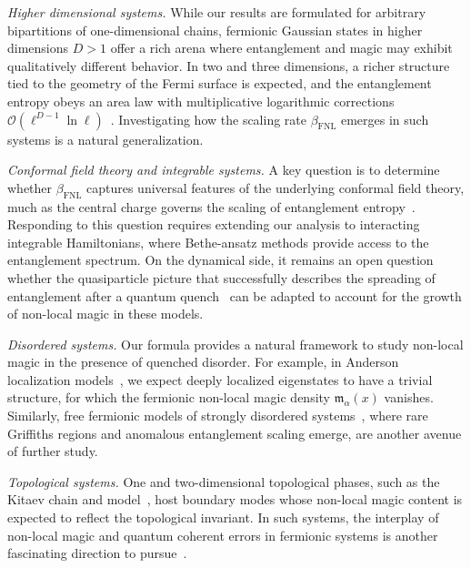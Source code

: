 \documentclass[prx,twocolumn,superscriptaddress,aps,10pt, frontmatterverbose, reprint,footinbib,longbibliography=true]{revtex4-2}
\newcommand{\RENYI}{\alpha}
\begin{document}
\emph{Higher dimensional systems.}
While our results are formulated for arbitrary bipartitions of one-dimensional chains, fermionic Gaussian states in higher dimensions $D>1$ offer a rich arena where entanglement and magic may exhibit qualitatively different behavior. In two and three dimensions, a richer structure tied to the geometry of the Fermi surface is expected, and the entanglement entropy obeys an area law with multiplicative logarithmic corrections $\mathcal{O}(\ell^{D-1}\ln\ell)$~\cite{swingle2010entanglement}. 
Investigating how the scaling rate $\beta_\mathrm{FNL}$ emerges in such systems is a natural generalization.


\emph{Conformal field theory and integrable systems.}
A key question is to determine whether $\beta_{\mathrm{FNL}}$ captures universal features of the underlying conformal field theory, much as the central charge governs the scaling of entanglement entropy~\cite{Calabrese2004entanglement}.
Responding to this question requires extending our analysis to interacting integrable Hamiltonians, where Bethe-ansatz methods provide access to the entanglement spectrum.
On the dynamical side, it remains an open question whether the quasiparticle picture that successfully describes the spreading of entanglement after a quantum quench~\cite{Alba_2017,alba2019,Kudler_Flam_2021} can be adapted to account for the growth of non-local magic in these models.

\emph{Disordered systems.}
Our formula provides a natural framework to study non-local magic in the presence of quenched disorder. 
For example, in Anderson localization models~\cite{evers,sierant2020}, we expect deeply localized eigenstates to have a trivial structure, for which the fermionic non-local magic density $\mathfrak{m}_\RENYI(x)$ vanishes. 
Similarly, free fermionic models of strongly disordered systems~\cite{IGLOI_2005,Monthus_2018,ruggiero2022}, where rare Griffiths regions and anomalous entanglement scaling emerge, are another avenue of further study.

\emph{Topological systems.}
One and two-dimensional topological phases, such as the Kitaev chain and model~\cite{Kitaev2001chain,Kitaev_2006}, host boundary modes whose non-local magic content is expected to reflect the topological invariant.
In such systems, the interplay of non-local magic and quantum coherent errors in fermionic systems is another fascinating direction to pursue~\cite{beri,gskb-t5ql}.
\end{document}
